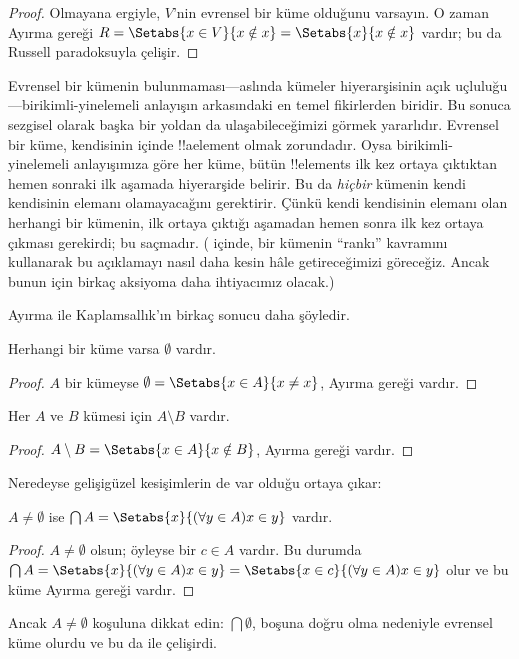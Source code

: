 \documentclass[../../../include/open-logic-section]{subfiles}
\begin{document}
\begin{proof}
Olmayana ergiyle, $V$'nin evrensel bir küme olduğunu varsayın. O zaman
Ayırma gereği $R = \Setabs{x \in V}{x \notin x} =
\Setabs{x}{x \notin x}$ vardır; bu da Russell paradoksuyla çelişir.
\end{proof}

Evrensel bir kümenin bulunmaması---aslında kümeler hiyerarşisinin açık
uçluluğu---birikimli-yinelemeli anlayışın arkasındaki en temel fikirlerden
biridir. Bu sonuca sezgisel olarak başka bir yoldan da ulaşabileceğimizi
görmek yararlıdır. Evrensel bir küme, kendisinin içinde !!a{element}
olmak zorundadır. Oysa birikimli-yinelemeli anlayışımıza göre her küme,
bütün !!{element}s ilk kez ortaya çıktıktan hemen sonraki ilk aşamada
hiyerarşide belirir. Bu da \emph{hiçbir} kümenin kendi kendisinin elemanı
olamayacağını gerektirir. Çünkü kendi kendisinin elemanı olan herhangi bir
kümenin, ilk ortaya çıktığı aşamadan hemen sonra ilk kez ortaya çıkması
gerekirdi; bu saçmadır. ( içinde,
bir kümenin ``rankı'' kavramını kullanarak bu açıklamayı nasıl daha kesin
hâle getireceğimizi göreceğiz. Ancak bunun için birkaç aksiyoma daha
ihtiyacımız olacak.)

Ayırma ile Kaplamsallık'ın birkaç sonucu daha şöyledir.

\begin{prop}
Herhangi bir küme varsa $\emptyset$ vardır.
\end{prop}

\begin{proof}
$A$ bir kümeyse $\emptyset = \Setabs{x \in A}{x \neq x}$, Ayırma gereği
vardır.
\end{proof}

\begin{prop}
Her $A$ ve $B$ kümesi için $A \setminus B$ vardır.
\end{prop}

\begin{proof}
$A \setminus B = \Setabs{x \in A}{x \notin B}$, Ayırma gereği vardır.
\end{proof}

Neredeyse gelişigüzel kesişimlerin de var olduğu ortaya çıkar:

\begin{prop}
$A \neq \emptyset$ ise
$\bigcap A = \Setabs{x}{(\forall y \in A)x \in y}$ vardır.
\end{prop}

\begin{proof}
$A \neq \emptyset$ olsun; öyleyse bir $c \in A$ vardır. Bu durumda
$\bigcap A = \Setabs{x}{(\forall y \in A)x \in y} =
\Setabs{x \in c}{(\forall y \in A)x \in y}$ olur ve bu küme Ayırma
gereği vardır.
\end{proof}

Ancak $A \neq \emptyset$ koşuluna dikkat edin: $\bigcap\emptyset$,
boşuna doğru olma nedeniyle evrensel küme olurdu ve bu da
 ile çelişirdi.
\end{document}
